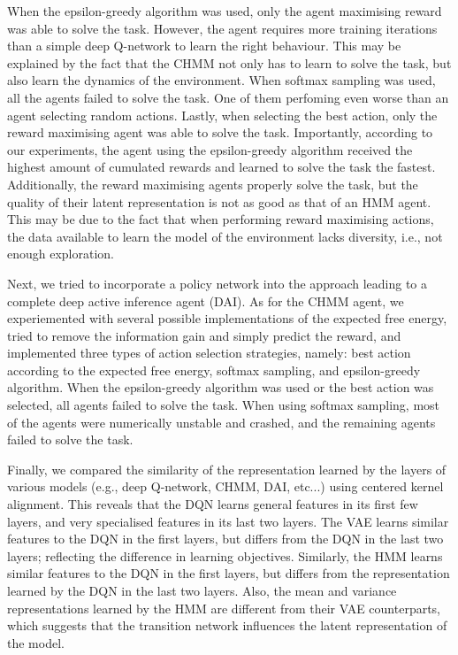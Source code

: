 \documentclass[twoside,11pt]{article}
\begin{document}
When the epsilon-greedy algorithm was used, only the agent maximising reward was able to solve the task.
However, the agent requires more training iterations than a simple deep Q-network to learn the right behaviour.
This may be explained by the fact that the CHMM not only has to learn to solve the task, but also learn the dynamics of the environment.
When softmax sampling was used, all the agents failed to solve the task. One of them perfoming even worse than an agent selecting random actions.
Lastly, when selecting the best action, only the reward maximising agent was able to solve the task.
Importantly, according to our experiments, the agent using the epsilon-greedy algorithm received the highest amount of cumulated rewards and learned to solve the task the fastest.
Additionally, the reward maximising agents properly solve the task, but the quality of their latent representation is not as good as that of an HMM agent.
This may be due to the fact that when performing reward maximising actions, the data available to learn the model of the environment lacks diversity, i.e., not enough exploration.

Next, we tried to incorporate a policy network into the approach leading to a complete deep active inference agent (DAI). As for the CHMM agent, we experiemented with several possible implementations of the expected free energy, tried to remove the information gain and simply predict the reward, and implemented three types of action selection strategies, namely: best action according to the expected free energy, softmax sampling, and epsilon-greedy algorithm. When the epsilon-greedy algorithm was used or the best action was selected, all agents failed to solve the task. When using softmax sampling, most of the agents were numerically unstable and crashed, and the remaining agents failed to solve the task. 

Finally, we compared the similarity of the representation learned by the layers of various models (e.g., deep Q-network, CHMM, DAI, etc...) using centered kernel alignment. This reveals that the DQN learns general features in its first few layers, and very specialised features in its last two layers. The VAE learns similar features to the DQN in the first layers, but differs from the DQN in the last two layers; reflecting the difference in learning objectives. Similarly, the HMM learns similar features to the DQN in the first layers, but differs from the representation learned by the DQN in the last two layers. Also, the mean and variance representations learned by the HMM are different from their VAE counterparts, which suggests that the transition network influences the latent representation of the model.
\end{document}
